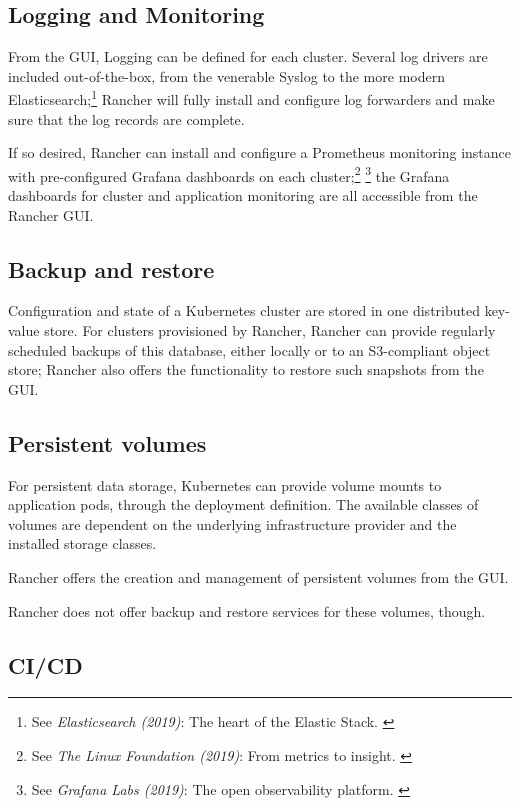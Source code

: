 \subsection{Logging and Monitoring}

From the GUI, Logging can be defined for each cluster. Several log drivers are included out-of-the-box, from the venerable Syslog to the more modern Elasticsearch;\footnote{See \textit{Elasticsearch (2019)}: The heart of the Elastic Stack. \cite{elastic}} Rancher will fully install and configure log forwarders and make sure that the log records are complete.

If so desired, Rancher can install and configure a Prometheus monitoring instance with pre-configured Grafana dashboards on each cluster;\footnote{See \textit{The Linux Foundation (2019)}: From metrics to insight. \cite{prometheus}} \footnote{See \textit{Grafana Labs (2019)}: The open observability platform. \cite{grafana}} the Grafana dashboards for cluster and application monitoring are all accessible from the Rancher GUI.

\subsection{Backup and restore}

Configuration and state of a Kubernetes cluster are stored in one distributed key-value store. For clusters provisioned by Rancher, Rancher can provide regularly scheduled backups of this database, either locally or to an S3-compliant object store; Rancher also offers the functionality to restore such snapshots from the GUI.

\subsection{Persistent volumes}

For persistent data storage, Kubernetes can provide volume mounts to application pods, through the deployment definition. The available classes of volumes are dependent on the underlying infrastructure provider and the installed storage classes.

Rancher offers the creation and management of persistent volumes from the GUI.

Rancher does not offer backup and restore services for these volumes, though.

\subsection{CI/CD}


